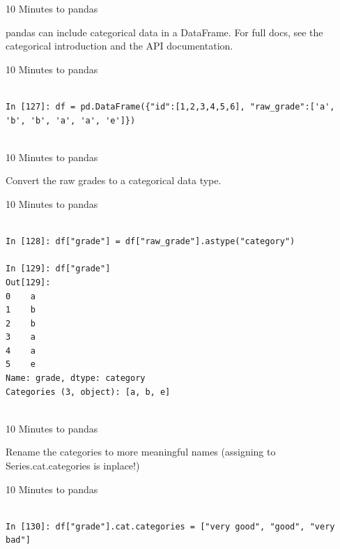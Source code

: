\documentclass{beamer}
\begin{document}
\begin{frame}[t]{10 Minutes to pandas}

pandas can include categorical data in a DataFrame. For full docs, see the
categorical introduction and the API documentation.

\end{frame}


\begin{frame}[t,fragile]{10 Minutes to pandas}


	\scriptsize
\begin{verbatim}

In [127]: df = pd.DataFrame({"id":[1,2,3,4,5,6], "raw_grade":['a', 'b', 'b', 'a', 'a', 'e']})


\end{verbatim}


\end{frame}


\begin{frame}[t]{10 Minutes to pandas}

Convert the raw grades to a categorical data type.

\end{frame}


\begin{frame}[t,fragile]{10 Minutes to pandas}


	\scriptsize
\begin{verbatim}

In [128]: df["grade"] = df["raw_grade"].astype("category")

In [129]: df["grade"]
Out[129]: 
0    a
1    b
2    b
3    a
4    a
5    e
Name: grade, dtype: category
Categories (3, object): [a, b, e]


\end{verbatim}


\end{frame}


\begin{frame}[t]{10 Minutes to pandas}

Rename the categories to more meaningful names (assigning to Series.cat.categories is inplace!)

\end{frame}


\begin{frame}[t,fragile]{10 Minutes to pandas}


	\scriptsize
\begin{verbatim}

In [130]: df["grade"].cat.categories = ["very good", "good", "very bad"]


\end{verbatim}


\end{frame}
\end{document}
